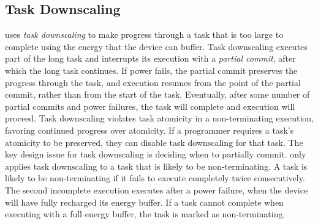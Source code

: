 


\label{sec:task_downsizing}
\subsection{Task Downscaling}
\sys uses {\em task downscaling} to make progress through a task that is too large to complete using the energy that the device can buffer. Task downscaling executes part of the long task and interrupts its execution with a {\em partial commit}, after which the long task continues. If power fails, the partial commit preserves the progress through the task, and execution resumes from the point of the partial commit, rather than from the start of the task. Eventually, after some number of partial commits and power failures, the task will complete and execution will proceed. Task downscaling violates task atomicity in a non-terminating execution, favoring continued progress over atomicity. If a programmer requires a task's atomicity to be preserved, they can disable task downscaling for that task.
The key design issue for task downscaling is deciding when to partially commit. \sys only applies task downscaling to a task that is likely to be non-terminating.  A task is likely to be non-terminating if it fails to execute completely twice consecutively. The second incomplete execution executes after a power failure, when the device will have fully recharged its energy buffer. If a task cannot complete when executing with a full energy buffer, the task is marked as non-terminating.